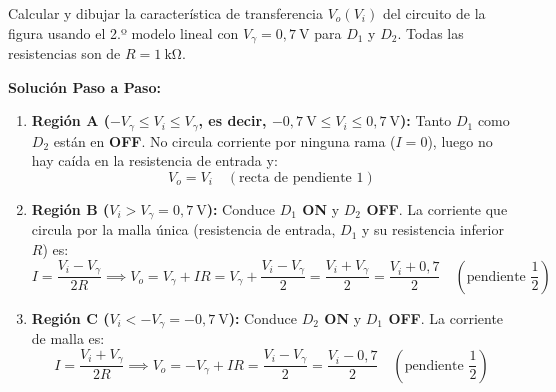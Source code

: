 \begin{ejercicio}
Calcular y dibujar la característica de transferencia $V_o(V_i)$ del circuito de la figura usando el 2.º modelo lineal con $V_\gamma = 0{,}7\ \si{\volt}$ para $D_1$ y $D_2$. Todas las resistencias son de $R = 1\ \si{\kilo\ohm}$.
\tcbline
\begin{center}
\end{center}
\textbf{Solución Paso a Paso:}\\[4pt]
\begin{enumerate}[label=\Alph*)]
    \item \textbf{Región A ($-V_\gamma \le V_i \le V_\gamma$, es decir, $-0{,}7\ \si{\volt} \le V_i \le 0{,}7\ \si{\volt}$):}
    Tanto $D_1$ como $D_2$ están en \textbf{OFF}. No circula corriente por ninguna rama ($I = 0$), luego no hay caída en la resistencia de entrada y:
    \begin{equation}
        V_o = V_i \quad (\text{recta de pendiente } 1)
    \end{equation}
    \item \textbf{Región B ($V_i > V_\gamma = 0{,}7\ \si{\volt}$):}
    Conduce \textbf{$D_1$ ON} y \textbf{$D_2$ OFF}. La corriente que circula por la malla única (resistencia de entrada, $D_1$ y su resistencia inferior $R$) es:
    \begin{equation}
        I = \frac{V_i - V_\gamma}{2R} \implies V_o = V_\gamma + I R = V_\gamma + \frac{V_i - V_\gamma}{2} = \frac{V_i + V_\gamma}{2} = \frac{V_i + 0{,}7}{2} \quad \left(\text{pendiente } \frac{1}{2}\right)
    \end{equation}
    \item \textbf{Región C ($V_i < -V_\gamma = -0{,}7\ \si{\volt}$):}
    Conduce \textbf{$D_2$ ON} y \textbf{$D_1$ OFF}. La corriente de malla es:
    \begin{equation}
        I = \frac{V_i + V_\gamma}{2R} \implies V_o = -V_\gamma + I R = \frac{V_i - V_\gamma}{2} = \frac{V_i - 0{,}7}{2} \quad \left(\text{pendiente } \frac{1}{2}\right)
    \end{equation}
\end{enumerate}
\end{ejercicio}

